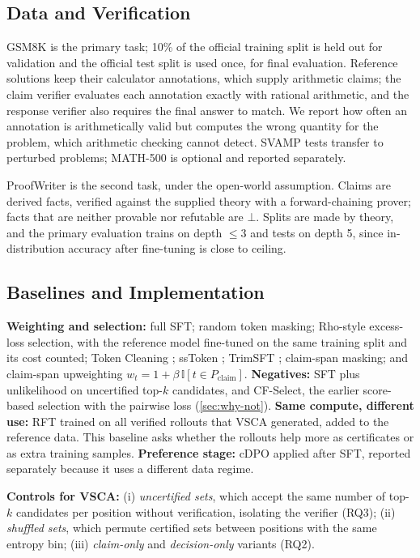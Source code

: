 \documentclass{article}
\newcommand{\vsca}{\textsc{VSCA}}
\newcommand{\ind}{\mathbb{I}}
\theoremstyle{plain}
\theoremstyle{remark}
\begin{document}
\subsection{Data and Verification}
GSM8K \citep{gsm8k} is the primary task; 10\% of the official training split is held out for validation and the official test split is used once, for final evaluation. Reference solutions keep their calculator annotations, which supply arithmetic claims; the claim verifier evaluates each annotation exactly with rational arithmetic, and the response verifier also requires the final answer to match. We report how often an annotation is arithmetically valid but computes the wrong quantity for the problem, which arithmetic checking cannot detect. SVAMP \citep{svamp} tests transfer to perturbed problems; MATH-500 is optional and reported separately.

ProofWriter \citep{proofwriter} is the second task, under the open-world assumption. Claims are derived facts, verified against the supplied theory with a forward-chaining prover; facts that are neither provable nor refutable are $\bot$. Splits are made by theory, and the primary evaluation trains on depth $\leq 3$ and tests on depth 5, since in-distribution accuracy after fine-tuning is close to ceiling.

\subsection{Baselines and Implementation}
\label{sec:baselines}
\textbf{Weighting and selection:} full SFT; random token masking; Rho-style excess-loss selection, with the reference model fine-tuned on the same training split and its cost counted; Token Cleaning \citep{tokenCleaning}; ssToken \citep{ssToken}; TrimSFT \citep{trimSFT}; claim-span masking; and claim-span upweighting $w_t=1+\beta\,\ind[t\in P_{\mathrm{claim}}]$. \textbf{Negatives:} SFT plus unlikelihood on uncertified top-$k$ candidates, and CF-Select, the earlier score-based selection with the pairwise loss (\cref{sec:why-not}). \textbf{Same compute, different use:} RFT \citep{rft} trained on all verified rollouts that \vsca{} generated, added to the reference data. This baseline asks whether the rollouts help more as certificates or as extra training samples. \textbf{Preference stage:} cDPO \citep{cdpo} applied after SFT, reported separately because it uses a different data regime.

\textbf{Controls for \vsca:} (i) \emph{uncertified sets}, which accept the same number of top-$k$ candidates per position without verification, isolating the verifier (RQ3); (ii) \emph{shuffled sets}, which permute certified sets between positions with the same entropy bin; (iii) \emph{claim-only} and \emph{decision-only} variants (RQ2).
\end{document}
